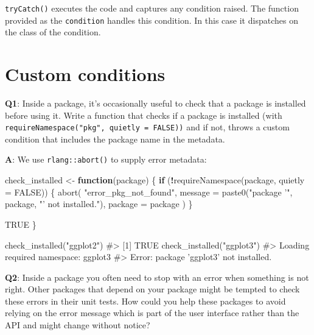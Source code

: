 \documentclass[
]{krantz}
\makeatletter
\newenvironment{Shaded}{\begin{snugshade}}{\end{snugshade}}
\newcommand{\CommentTok}[1]{\textcolor[rgb]{0.56,0.35,0.01}{\textit{#1}}}
\newcommand{\ControlFlowTok}[1]{\textcolor[rgb]{0.13,0.29,0.53}{\textbf{#1}}}
\newcommand{\DataTypeTok}[1]{\textcolor[rgb]{0.13,0.29,0.53}{#1}}
\newcommand{\KeywordTok}[1]{\textcolor[rgb]{0.13,0.29,0.53}{\textbf{#1}}}
\newcommand{\NormalTok}[1]{#1}
\newcommand{\OperatorTok}[1]{\textcolor[rgb]{0.81,0.36,0.00}{\textbf{#1}}}
\newcommand{\OtherTok}[1]{\textcolor[rgb]{0.56,0.35,0.01}{#1}}
\newcommand{\StringTok}[1]{\textcolor[rgb]{0.31,0.60,0.02}{#1}}
\newenvironment{kframe}{%
\medskip{}
\setlength{\fboxsep}{.8em}
 \def\at@end@of@kframe{}%
 \ifinner\ifhmode%
  \def\at@end@of@kframe{\end{minipage}}%
  \begin{minipage}{\columnwidth}%
 \fi\fi%
 \def\FrameCommand##1{\hskip\@totalleftmargin \hskip-\fboxsep
 \colorbox{shadecolor}{##1}\hskip-\fboxsep
     \hskip-\linewidth \hskip-\@totalleftmargin \hskip\columnwidth}%
 \MakeFramed {\advance\hsize-\width
   \@totalleftmargin\z@ \linewidth\hsize
   \@setminipage}}%
 {\par\unskip\endMakeFramed%
 \at@end@of@kframe}
\renewenvironment{Shaded}{\begin{kframe}}{\end{kframe}}
\renewcommand{\KeywordTok} [1]{\textcolor[rgb]{0.00,0.44,0.13}{{#1}}}
\renewcommand{\DataTypeTok}[1]{\textcolor[rgb]{0.56,0.13,0.00}{{#1}}}
\renewcommand{\StringTok}  [1]{\textcolor[rgb]{0.25,0.44,0.63}{{#1}}}
\renewcommand{\CommentTok} [1]{\textcolor[rgb]{0.38,0.63,0.69}{{#1}}}
\renewcommand{\OtherTok}   [1]{\textcolor[rgb]{0.00,0.44,0.13}{{#1}}}
\renewcommand{\NormalTok}  [1]{{#1}}
\makeatother
\begin{document}
\texttt{tryCatch()} executes the code and captures any condition raised. The function provided as the \texttt{condition} handles this condition. In this case it dispatches on the class of the condition.

\hypertarget{custom-conditions}{%
\section{Custom conditions}\label{custom-conditions}}

\textbf{{Q1}}: Inside a package, it's occasionally useful to check that a package is installed before using it. Write a function that checks if a package is installed (with \texttt{requireNamespace("pkg",\ quietly\ =\ FALSE))} and if not, throws a custom condition that includes the package name in the metadata.

\textbf{{A}}: We use \texttt{rlang::abort()} to supply error metadata:

\begin{Shaded}
\begin{Highlighting}[]
\NormalTok{check_installed <-}\StringTok{ }\ControlFlowTok{function}\NormalTok{(package) \{}
  \ControlFlowTok{if}\NormalTok{ (}\OperatorTok{!}\KeywordTok{requireNamespace}\NormalTok{(package, }\DataTypeTok{quietly =} \OtherTok{FALSE}\NormalTok{)) \{}
    \KeywordTok{abort}\NormalTok{(}
      \StringTok{"error_pkg_not_found"}\NormalTok{,}
      \DataTypeTok{message =} \KeywordTok{paste0}\NormalTok{(}\StringTok{"package '"}\NormalTok{, package, }\StringTok{"' not installed."}\NormalTok{),}
      \DataTypeTok{package =}\NormalTok{ package}
\NormalTok{    )}
\NormalTok{  \}}

  \OtherTok{TRUE}
\NormalTok{\}}

\KeywordTok{check_installed}\NormalTok{(}\StringTok{"ggplot2"}\NormalTok{)}
\CommentTok{#> [1] TRUE}
\KeywordTok{check_installed}\NormalTok{(}\StringTok{"ggplot3"}\NormalTok{)}
\CommentTok{#> Loading required namespace: ggplot3}
\CommentTok{#> Error: package 'ggplot3' not installed.}
\end{Highlighting}
\end{Shaded}

\textbf{{Q2}}: Inside a package you often need to stop with an error when something is not right. Other packages that depend on your package might be tempted to check these errors in their unit tests. How could you help these packages to avoid relying on the error message which is part of the user interface rather than the API and might change without notice?
\end{document}
